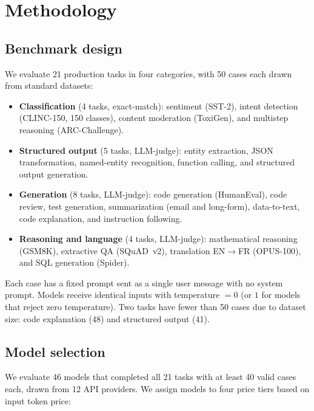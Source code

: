 \documentclass[11pt]{article}
\begin{document}
\section{Methodology}

\subsection{Benchmark design}

We evaluate 21 production tasks in four categories, with 50 cases each
drawn from standard datasets:

\begin{itemize}[leftmargin=*,itemsep=1pt]
\item \textbf{Classification} (4 tasks, exact-match): sentiment (SST-2),
  intent detection (CLINC-150, 150 classes), content moderation
  (ToxiGen), and multistep reasoning (ARC-Challenge).
\item \textbf{Structured output} (5 tasks, LLM-judge): entity
  extraction, JSON transformation, named-entity recognition, function
  calling, and structured output generation.
\item \textbf{Generation} (8 tasks, LLM-judge): code generation
  (HumanEval), code review, test generation, summarization (email and
  long-form), data-to-text, code explanation, and instruction following.
\item \textbf{Reasoning and language} (4 tasks, LLM-judge): mathematical
  reasoning (GSM8K), extractive QA (SQuAD~v2), translation EN$\to$FR
  (OPUS-100), and SQL generation (Spider).
\end{itemize}

Each case has a fixed prompt sent as a single user message with no system
prompt.  Models receive identical inputs with temperature $= 0$ (or $1$
for models that reject zero temperature).  Two tasks have fewer than 50
cases due to dataset size: code explanation (48) and structured output
(41).

\subsection{Model selection}

We evaluate 46 models that completed all 21 tasks with at least 40 valid
cases each, drawn from 12 API providers.  We assign models to four price
tiers based on input token price:
\end{document}
